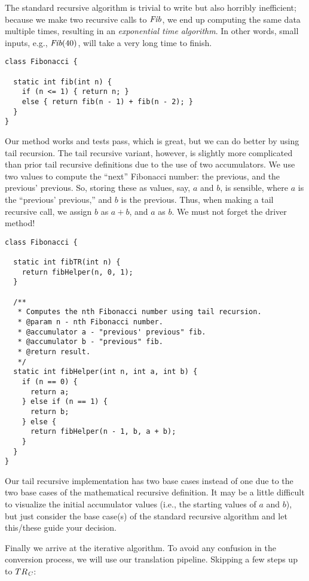 The standard recursive algorithm is trivial to write but also horribly inefficient; because we make two recursive calls to $\emph{Fib}$, we end up computing the same data multiple times, resulting in an \emph{exponential time algorithm}. In other words, small inputs, e.g., $\emph{Fib}(40)$, will take a very long time to finish.


\begin{lstlisting}[language=MyJava]
class Fibonacci {

  static int fib(int n) {
    if (n <= 1) { return n; } 
    else { return fib(n - 1) + fib(n - 2); }
  }
}
\end{lstlisting}

Our method works and tests pass, which is great, but we can do better by using tail recursion. The tail recursive variant, however, is slightly more complicated than prior tail recursive definitions due to the use of two accumulators. We use two values to compute the ``next'' Fibonacci number: the previous, and the previous' previous. So, storing these as values, say, $a$ and $b$, is sensible, where $a$ is the ``previous' previous,'' and $b$ is the previous. Thus, when making a tail recursive call, we assign $b$ as $a + b$, and $a$ as $b$. We must not forget the driver method!

\begin{lstlisting}[language=MyJava]
class Fibonacci {

  static int fibTR(int n) {
    return fibHelper(n, 0, 1);
  }

  /**
   * Computes the nth Fibonacci number using tail recursion.
   * @param n - nth Fibonacci number.
   * @accumulator a - "previous' previous" fib.
   * @accumulator b - "previous" fib.
   * @return result.
   */
  static int fibHelper(int n, int a, int b) {
    if (n == 0) {
      return a;
    } else if (n == 1) {
      return b;
    } else {
      return fibHelper(n - 1, b, a + b);
    }
  }
}
\end{lstlisting}

Our tail recursive implementation has two base cases instead of one due to the two base cases of the mathematical recursive definition. It may be a little difficult to visualize the initial accumulator values (i.e., the starting values of $a$ and $b$), but just consider the base case(s) of the standard recursive algorithm and let this/these guide your decision.

Finally we arrive at the iterative algorithm. To avoid any confusion in the conversion process, we will use our translation pipeline. Skipping a few steps up to $TR_\emph{C}$:

